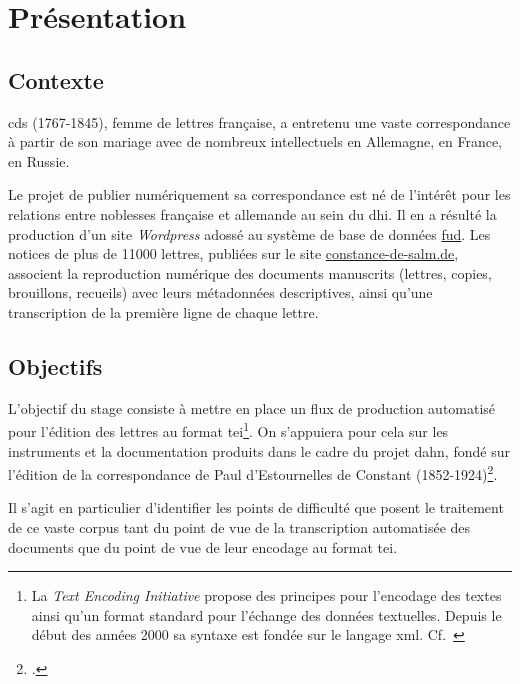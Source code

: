 \documentclass[a4paper,12pt,twoside]{book}
\begin{document}
	
	\tableofcontents
	
	\chapter*{Présentation}
	
		\section*{Contexte}
			\gls{cds} (1767-1845), femme de lettres française, a entretenu une vaste correspondance à partir de son mariage avec de nombreux intellectuels en Allemagne, en France, en Russie.
	
			Le projet de publier numériquement sa correspondance est né de l'intérêt pour les relations entre noblesses française et allemande au sein du \gls{dhi}. Il en a résulté la production d'un site \textit{Wordpress} adossé au système de base de données \href{https://fud.uni-trier.de/}{\gls{fud}}. Les notices de plus de 11000 lettres, publiées sur le site \href{https://constance-de-salm.de}{constance-de-salm.de}, associent la reproduction numérique des documents manuscrits (lettres, copies, brouillons, recueils) avec leurs métadonnées descriptives, ainsi qu'une transcription de la première ligne de chaque lettre.
	
		\section*{Objectifs}
			L'objectif du stage consiste à mettre en place un flux de production automatisé pour l'édition des lettres au format \gls{tei}\footnote{La \textit{Text Encoding Initiative} propose des principes pour l'encodage des textes ainsi qu'un format standard pour l'échange des données textuelles. Depuis le début des années 2000 sa syntaxe est fondée sur le langage \gls{xml}. Cf.~\cite{TEITextEncoding}}. On s'appuiera pour cela sur les instruments et la documentation produits dans le cadre du projet \gls{dahn}, fondé sur l'édition de la correspondance de Paul d’Estournelles de Constant (1852-1924)\footcite{chiffoleauDAHNProject}.
			
			Il s'agit en particulier d'identifier les points de difficulté que posent le traitement de ce vaste corpus tant du point de vue de la transcription automatisée des documents que du point de vue de leur encodage au format \gls{tei}. 
			
\end{document}
